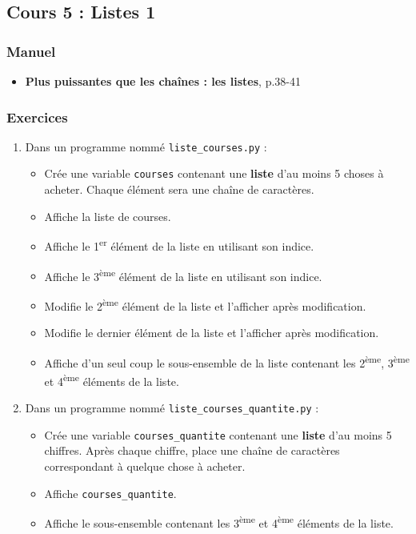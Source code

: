 \documentclass[11pt]{article}
\begin{document}
\subsection*{Cours 5 : Listes 1}
\label{chapitre2_cours5}
\subsubsection*{Manuel}
\label{sec:org8393984}
\begin{itemize}
\item \textbf{\og Plus puissantes que les chaînes : les listes\fg{}}, p.38-41
\end{itemize}
\subsubsection*{Exercices}
\label{sec:org4fdb45a}
\begin{enumerate}
\item Dans un programme nommé \texttt{liste\_courses.py} :
\begin{itemize}
\item Crée une variable \texttt{courses} contenant une \textbf{liste} d'au moins 5 choses à acheter. Chaque élément sera une chaîne de caractères.
\item Affiche la liste de courses.
\item Affiche le 1\textsuperscript{er} élément de la liste en utilisant son indice.
\item Affiche le 3\textsuperscript{ème} élément de la liste en utilisant son indice.
\item Modifie le 2\textsuperscript{ème} élément de la liste et l'afficher après modification.
\item Modifie le dernier élément de la liste et l'afficher après modification.
\item Affiche d'un seul coup le sous-ensemble de la liste contenant les 2\textsuperscript{ème}, 3\textsuperscript{ème} et 4\textsuperscript{ème} éléments de la liste.
\end{itemize}

\item Dans un programme nommé \texttt{liste\_courses\_quantite.py} :
\begin{itemize}
\item Crée une variable \texttt{courses\_quantite} contenant une \textbf{liste} d'au moins 5 chiffres. Après chaque chiffre, place une chaîne de caractères correspondant à quelque chose à acheter.
\item Affiche \texttt{courses\_quantite}.
\item Affiche le sous-ensemble contenant les 3\textsuperscript{ème} et 4\textsuperscript{ème} éléments de la liste.
\end{itemize}


\end{enumerate}
\end{document}
